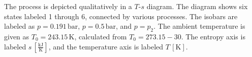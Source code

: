 The process is depicted qualitatively in a \( T \)-\( s \) diagram. The diagram shows six states labeled 1 through 6, connected by various processes. The isobars are labeled as \( p = 0.191 \, \text{bar} \), \( p = 0.5 \, \text{bar} \), and \( p = p_2 \). The ambient temperature is given as \( T_0 = 243.15 \, \text{K} \), calculated from \( T_0 = 273.15 - 30 \). The entropy axis is labeled \( s \, [\frac{\text{kJ}}{\text{K}}] \), and the temperature axis is labeled \( T \, [\text{K}] \).